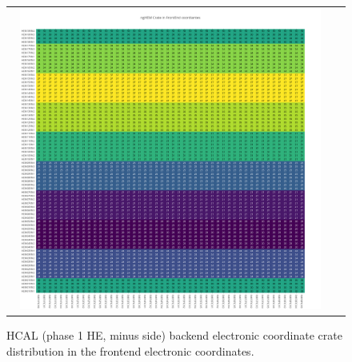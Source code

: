 \begin{figure}[htb]
 \begin{center}
  \begin{tabular}{cc}
   \includegraphics[angle=0,width=0.95\textwidth]{figures/appendix/ngHEM_Crate_in_FrontEnd.png}
  \end{tabular}
  \caption{HCAL (phase 1 HE, minus side) backend electronic coordinate crate distribution in the frontend electronic coordinates.}
  \label{fig:lmapngHEMCrateFEC}
 \end{center}
\end{figure}
\clearpage

